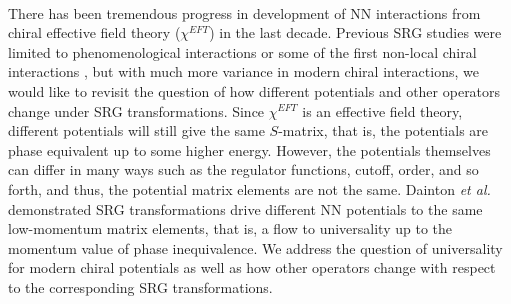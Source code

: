 \documentclass[preprintnumbers,floatfix,aps,prc,preprint,nofootinbib]{revtex4-1}
\begin{document}

\\
There has been tremendous progress in development of NN interactions from chiral effective field theory ($\chi^{EFT}$) in the last decade. Previous SRG studies were limited to phenomenological interactions or some of the first non-local chiral interactions \cite{Entem:2003ft}, but with much more variance in modern chiral interactions, we would like to revisit the question of how different potentials and other operators change under SRG transformations. Since $\chi^{EFT}$ is an effective field theory, different potentials will still give the same $S$-matrix, that is, the potentials are phase equivalent up to some higher energy. However, the potentials themselves can differ in many ways such as the regulator functions, cutoff, order, and so forth, and thus, the potential matrix elements are not the same. Dainton \textit{et al.} \cite{Dainton:2013axa} demonstrated SRG transformations drive different NN potentials to the same low-momentum matrix elements, that is, a flow to universality up to the momentum value of phase inequivalence. We address the question of universality for modern chiral potentials as well as how other operators change with respect to the corresponding SRG transformations.
\\
\end{document}
